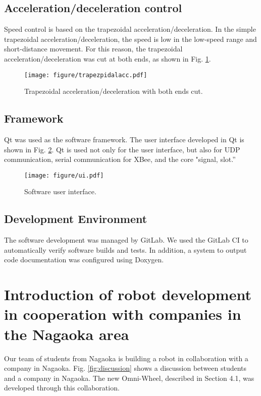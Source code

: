 \documentclass[]{llncs}
\begin{document}
\subsection{Acceleration/deceleration control}
%
Speed control is based on the trapezoidal acceleration/deceleration.
%
In the simple trapezoidal acceleration/deceleration, the speed is low in the low-speed range and short-distance movement.
%
For this reason, the trapezoidal acceleration/deceleration was cut at both ends, as shown in Fig. \ref{fig:acc}.
%
\begin{figure}[ttbp]
    \centering
    \texttt{[image: figure/trapezpidalacc.pdf]}
    \caption{Trapezoidal acceleration/deceleration with both ends cut.}
    \label{fig:acc}
\end{figure}


\subsection{Framework}
%
Qt was used as the software framework. The user interface developed in Qt is shown in Fig. \ref{fig:ui}.
%
Qt is used not only for the user interface, but also for UDP communication, serial communication for XBee, and the core "signal, slot.”
%
\begin{figure}[ttbp]
    \centering
    \texttt{[image: figure/ui.pdf]}
    \caption{Software user interface.}
    \label{fig:ui}
\end{figure}


\subsection{Development Environment}
%
The software development was managed by GitLab.
%
We used the GitLab CI to automatically verify software builds and tests.
%
In addition, a system to output code documentation was configured using Doxygen.


\section{Introduction of robot development in cooperation with companies in the Nagaoka area}
%
Our team of students from Nagaoka is building a robot in collaboration with a company in Nagaoka.
%
Fig. \ref{fig:discussion} shows a discussion between students and a company in Nagaoka. The new Omni-Wheel, described in Section 4.1, was developed through this collaboration.
%
\end{document}

